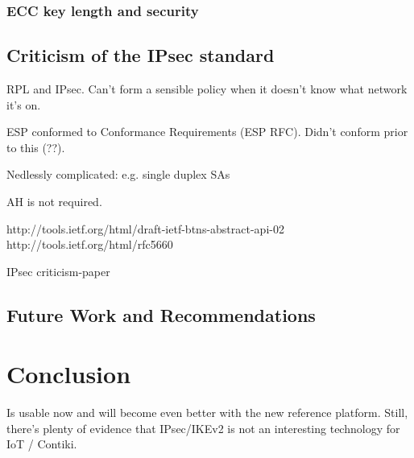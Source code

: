\documentclass[final,a4paper,twoside,11pt,onecolumn]{report}
\begin{document}
\subsection{ECC key length and security}

\cite{Ferguson00acryptographic}


\section{Criticism of the IPsec standard}
RPL and IPsec. Can't form a sensible policy when it doesn't know what network it's on.

ESP conformed to Conformance Requirements (ESP RFC). Didn't conform prior to this (??).

Nedlessly complicated: e.g. single duplex SAs

AH is not required.

http://tools.ietf.org/html/draft-ietf-btns-abstract-api-02
http://tools.ietf.org/html/rfc5660

IPsec criticism-paper


\section{Future Work and Recommendations}
\label{sec:fw}

   
\chapter{Conclusion}
Is usable now and will become even better with the new reference platform. Still, there's plenty of evidence that IPsec/IKEv2 is not an interesting technology for IoT / Contiki.






\end{document}

